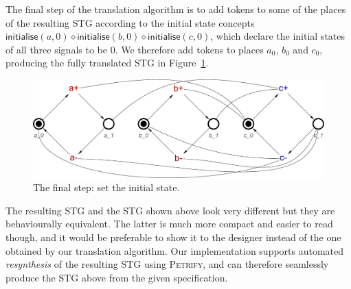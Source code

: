 \documentclass[british, journal]{IEEEtran}
\newcommand{\noun}[1]{\textsc{#1}}
\begin{document}
The final step of the translation algorithm is to add tokens to some of the
places
of the resulting STG according to the initial state concepts
$\mathsf{initialise}(a,0) \diamond \mathsf{initialise}(b,0) \diamond
\mathsf{initialise}(c,0)$, which declare the initial states of all three signals
to be 0. We therefore
add tokens to places $a_0$, $b_0$ and $c_0$, producing the fully translated STG
in
Figure~\ref{fig:step-by-step12}.

\begin{figure}[h]
\begin{centering}
\includegraphics[scale=0.23]{Images/Step-by-step12}
\par
\protect\caption{\label{fig:step-by-step12}The final step: set the initial
state.}
\par\end{centering}
\vspace{-3mm}
\end{figure}

The resulting STG and the STG shown above
look very different but they are behaviourally equivalent. The latter is much
more
compact and easier to read though, and it would be preferable to show it to the
designer instead of the one obtained by our translation algorithm. Our
implementation supports automated \emph{resynthesis} of the resulting STG
using \noun{Petrify}, and can therefore seamlessly produce the STG above 
from the given specification.


%
\end{document}
